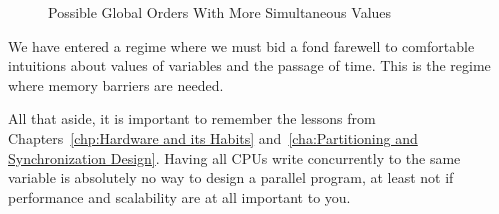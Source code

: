 \begin{figure}[htb]
\centering
{}
\caption{Possible Global Orders With More Simultaneous Values}
\label{fig:advsync:Possible Global Orders With More Simultaneous Values}
\end{figure}

We have entered a regime where we must bid a fond farewell to
comfortable intuitions about values of variables and the passage of time.
This is the regime where memory barriers are needed.

All that aside, it is important to remember the lessons from
Chapters~\ref{chp:Hardware and its Habits}
and~\ref{cha:Partitioning and Synchronization Design}.
Having all CPUs write concurrently to the same variable
is absolutely no way to design a parallel program, at least
not if performance and scalability are at all important to you.

